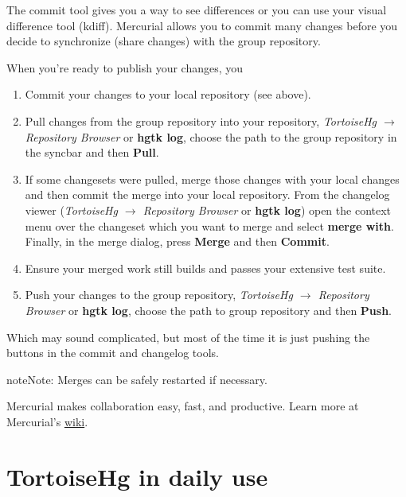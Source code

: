 \documentclass[letterpaper,10pt,english]{manual}
\begin{document}
The commit tool gives you a way to see differences or you can use your
visual difference tool (kdiff). Mercurial allows you to commit many
changes before you decide to synchronize (share changes) with the group
repository.

When you're ready to publish your changes, you
\begin{enumerate}
\item {} 
Commit your changes to your local repository (see above).

\item {} 
Pull changes from the group repository into your repository,
\emph{TortoiseHg \(\rightarrow\) Repository Browser} or
\textbf{hgtk log}, choose the path to the group repository
in the syncbar and then \textbf{Pull}.

\item {} 
If some changesets were pulled, merge those changes with your local
changes and then commit the merge into your local repository. From
the changelog viewer (\emph{TortoiseHg \(\rightarrow\) Repository Browser}
or \textbf{hgtk log}) open the context menu over the changeset
which you want to merge and select \textbf{merge with}.
Finally, in the merge dialog, press \textbf{Merge} and then
\textbf{Commit}.

\item {} 
Ensure your merged work still builds and passes your extensive test suite.

\item {} 
Push your changes to the group repository,
\emph{TortoiseHg \(\rightarrow\) Repository Browser} or \textbf{hgtk log},
choose the path to group repository and then \textbf{Push}.

\end{enumerate}

Which may sound complicated, but most of the time it is just pushing the
buttons in the commit and changelog tools.

\begin{notice}{note}{Note:}
Merges can be safely restarted if necessary.
\end{notice}

Mercurial makes collaboration easy, fast, and productive.
Learn more at Mercurial's \href{http://mercurial.selenic.com/wiki/}{wiki}.

\resetcurrentobjects
\hypertarget{--doc-daily}{}

\chapter{TortoiseHg in daily use}
\end{document}
